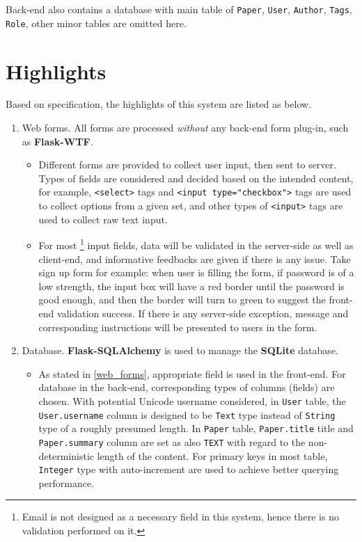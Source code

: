 \documentclass[letterpaper,12pt]{article}
\begin{document}
    Back-end also contains a database with main table of \texttt{Paper}, \texttt{User}, \texttt{Author}, \texttt{Tags}, \texttt{Role}, other minor tables are omitted here.
    
	\section{Highlights}
    
    Based on specification, the highlights of this system are listed as below.
    
    \begin{enumerate}[label=\alph*)]
        \item Web forms.\label{web_forms} All forms are processed \textit{without} any back-end form plug-in, such as \textbf{Flask-WTF}.
            \begin{itemize}
                \item Different forms are provided to collect user input, then sent to server.  Types of fields are considered and decided based on the intended content, for example, \texttt{<select>} tags and \texttt{<input type="checkbox">} tags are used to collect options from a given set, and other types of \texttt{<input>} tags are used to collect raw text input. 
                
                \item For most \footnote{Email is not designed as a necessary field in this system, hence there is no validation performed on it.} input fields, data will be validated in the server-side as well as client-end, and informative feedbacks are given if there is any issue. Take sign up form for example: when user is filling the form, if password is of a low strength, the input box will have a red border until the password is good enough, and then the border will turn to green to suggest the front-end validation success. If there is any server-side exception, message and corresponding instructions will be presented to users in the form. 
            \end{itemize}
            
        \item Database. \textbf{Flask-SQLAlchemy} is used to manage the \textbf{SQLite} database.
            \begin{itemize}
                \item As stated in \ref{web_forms}, appropriate field is used in the front-end. For database in the back-end, corresponding types of columns (fields) are chosen. With potential Unicode username considered, in \texttt{User} table, the \texttt{User.username} column is designed to be \texttt{Text} type instead of \texttt{String} type of a roughly presumed length. In \texttt{Paper} table, \texttt{Paper.title} title and \texttt{Paper.summary} column are set as also \texttt{TEXT} with regard to the non-deterministic length of the content. For primary keys in most table, \texttt{Integer} type with auto-increment are used to achieve better querying performance.
                

\end{itemize}
\end{enumerate}
\end{document}
